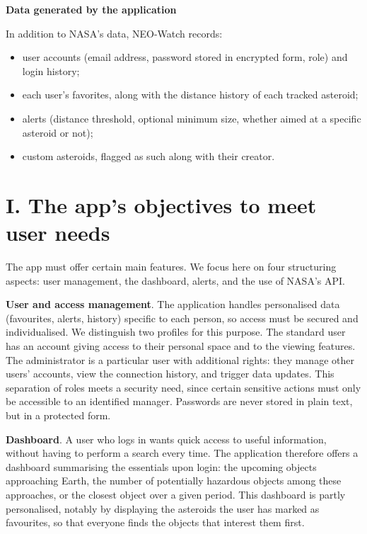 \documentclass[
  french,
  11pt,
  a4paper,
]{report}
\providecommand{\tightlist}{%
  \setlength{\itemsep}{0pt}\setlength{\parskip}{0pt}}
\begin{document}
\textbf{Data generated by the application}

In addition to NASA's data, NEO-Watch records:

\begin{itemize}
\tightlist
\item
  user accounts (email address, password stored in encrypted form, role)
  and login history;
\item
  each user's favorites, along with the distance history of each tracked
  asteroid;
\item
  alerts (distance threshold, optional minimum size, whether aimed at a
  specific asteroid or not);
\item
  custom asteroids, flagged as such along with their creator.
\end{itemize}

\chapter{I. The app's objectives to meet user
needs}\label{i.-the-apps-objectives-to-meet-user-needs}

The app must offer certain main features. We focus here on four
structuring aspects: user management, the dashboard, alerts, and the use
of NASA's API.

\textbf{User and access management}. The application handles
personalised data (favourites, alerts, history) specific to each person,
so access must be secured and individualised. We distinguish two
profiles for this purpose. The standard user has an account giving
access to their personal space and to the viewing features. The
administrator is a particular user with additional rights: they manage
other users' accounts, view the connection history, and trigger data
updates. This separation of roles meets a security need, since certain
sensitive actions must only be accessible to an identified manager.
Passwords are never stored in plain text, but in a protected form.

\textbf{Dashboard}. A user who logs in wants quick access to useful
information, without having to perform a search every time. The
application therefore offers a dashboard summarising the essentials upon
login: the upcoming objects approaching Earth, the number of potentially
hazardous objects among these approaches, or the closest object over a
given period. This dashboard is partly personalised, notably by
displaying the asteroids the user has marked as favourites, so that
everyone finds the objects that interest them first.
\end{document}
